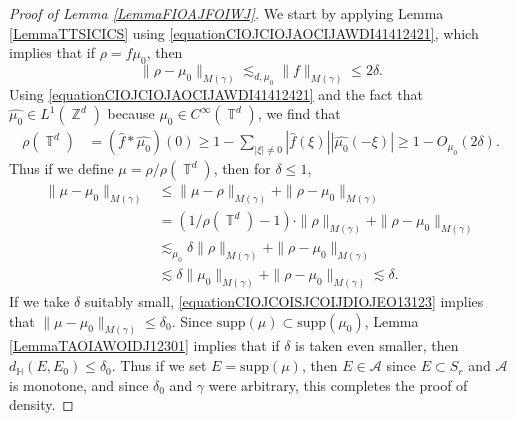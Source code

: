 \documentclass[dvipsnames,letterpaper,12pt]{article}
\numberwithin{equation}{section}
\DeclareMathOperator{\ZZ}{\mathbb{Z}}
\DeclareMathOperator{\TT}{\mathbb{T}}
\numberwithin{theorem}{section}
\begin{document}
\begin{proof}[Proof of Lemma \ref{LemmaFIOAJFOIWJ}]
    We start by applying Lemma \ref{LemmaTTSICICS} using \eqref{equationCIOJCIOJAOCIJAWDI41412421}, which implies that if $\rho = f \mu_0$, then
    \begin{equation}
        \| \rho - \mu_0 \|_{M(\gamma)} \lesssim_{d,\mu_0} \| f \|_{M(\gamma)} \leq 2 \delta.
    \end{equation}
    Using \eqref{equationCIOJCIOJAOCIJAWDI41412421} and the fact that $\widehat{\mu_0} \in L^1(\ZZ^d)$ because $\mu_0 \in C^\infty(\TT^d)$, we find that
    \begin{equation} \label{equationFIOJCIOWJCOIJFIO}
    \begin{split}
        \rho(\TT^d) &= (\widehat{f} * \widehat{\mu_0})(0) \geq 1 - \sum_{|\xi| \neq 0} |\widehat{f}(\xi)| |\widehat{\mu_0}(-\xi)| \geq 1 - O_{\mu_0}(2 \delta).
    \end{split}
    \end{equation}
    Thus if we define $\mu = \rho / \rho(\TT^d)$, then for $\delta \leq 1$,
    \begin{equation} \label{equationCIOJCOISJCOIJDIOJEO13123}
    \begin{split}
        \| \mu - \mu_0 \|_{M(\gamma)} &\leq \| \mu - \rho \|_{M(\gamma)} + \| \rho - \mu_0 \|_{M(\gamma)}\\
        &= (1 / \rho(\TT^d) - 1) \cdot \| \rho \|_{M(\gamma)} + \| \rho - \mu_0 \|_{M(\gamma)}\\
        &\lesssim_{\mu_0} \delta \| \rho \|_{M(\gamma)} + \| \rho - \mu_0 \|_{M(\gamma)}\\
        &\lesssim \delta \| \mu_0 \|_{M(\gamma)} + \| \rho - \mu_0 \|_{M(\gamma)} \lesssim \delta.
    \end{split}
    \end{equation}
    If we take $\delta$ suitably small, \eqref{equationCIOJCOISJCOIJDIOJEO13123} implies that $\| \mu - \mu_0 \|_{M(\gamma)} \leq \delta_0$. Since $\text{supp}(\mu) \subset \text{supp}(\mu_0)$, Lemma \ref{LemmaTAOIAWOIDJ12301} implies that if $\delta$ is taken even smaller, then $d_{\mathbb{H}}(E, E_0) \leq \delta_0$. Thus if we set $E = \text{supp}(\mu)$, then $E \in \mathcal{A}$ since $E \subset S_r$ and $\mathcal{A}$ is monotone, and since $\delta_0$ and $\gamma$ were arbitrary, this completes the proof of density.
\end{proof}
\end{document}
